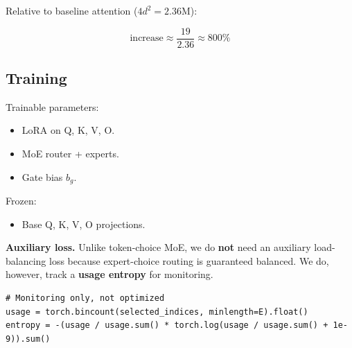 Relative to baseline attention ($4 d^2 = 2.36$M):

\[
\text{increase} \approx \frac{19}{2.36} \approx 800\%
\tag{4.15}
\]

\subsection{Training}

Trainable parameters:

\begin{itemize}
\item LoRA on Q, K, V, O.
\item MoE router + experts.
\item Gate bias $b_g$.

\end{itemize}
Frozen:

\begin{itemize}
\item Base Q, K, V, O projections.

\end{itemize}
\textbf{Auxiliary loss.} Unlike token-choice MoE, we do \textbf{not} need an 
auxiliary load-balancing loss because expert-choice routing is guaranteed 
balanced. We do, however, track a \textbf{usage entropy} for monitoring.

\begin{lstlisting}
# Monitoring only, not optimized
usage = torch.bincount(selected_indices, minlength=E).float()
entropy = -(usage / usage.sum() * torch.log(usage / usage.sum() + 1e-9)).sum()
\end{lstlisting}

